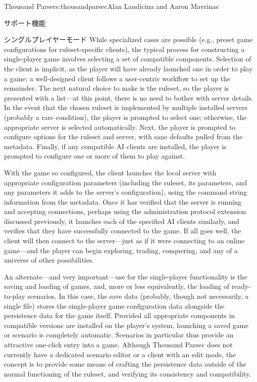 \begin{aosachapter}{Thousand Parsec}{s:thousandparsec}{Alan Laudicina and Aaron Mavrinac}
\begin{aosasect1}{サポート機能}
\begin{aosasect2}{シングルプレイヤーモード}
While specialized cases are possible (e.g., preset game configurations
for ruleset-specific clients), the typical process for constructing a
single-player game involves selecting a set of compatible
components. Selection of the client is implicit, as the player will
have already launched one in order to play a game; a well-designed
client follows a user-centric workflow to set up the remainder. The
next natural choice to make is the ruleset, so the player is presented
with a list---at this point, there is no need to bother with server
details. In the event that the chosen ruleset is implemented by
multiple installed servers (probably a rare condition), the player is
prompted to select one; otherwise, the appropriate server is selected
automatically. Next, the player is prompted to configure options for
the ruleset and server, with sane defaults pulled from the
metadata. Finally, if any compatible AI clients are installed, the
player is prompted to configure one or more of them to play against.

With the game so configured, the client launches the local server with
appropriate configuration parameters (including the ruleset, its
parameters, and any parameters it adds to the server's configuration),
using the command string information from the metadata. Once it has
verified that the server is running and accepting connections, perhaps
using the administration protocol extension discussed previously, it
launches each of the specified AI clients similarly, and verifies that
they have successfully connected to the game. If all goes well, the
client will then connect to the server---just as if it were connecting
to an online game---and the player can begin exploring, trading,
conquering, and any of a universe of other possibilities.

An alternate---and very important---use for the single-player
functionality is the saving and loading of games, and, more or less
equivalently, the loading of ready-to-play scenarios. In this case,
the save data (probably, though not necessarily, a single file) stores
the single-player game configuration data alongside the persistence
data for the game itself. Provided all appropriate components in
compatible versions are installed on the player's system, launching a
saved game or scenario is completely automatic. Scenarios in
particular thus provide an attractive one-click entry into a
game. Although Thousand Parsec does not currently have a dedicated
scenario editor or a client with an edit mode, the concept is to
provide some means of crafting the persistence data outside of the
normal functioning of the ruleset, and verifying its consistency and
compatibility.


\end{aosasect2}
\end{aosasect1}
\end{aosachapter}
